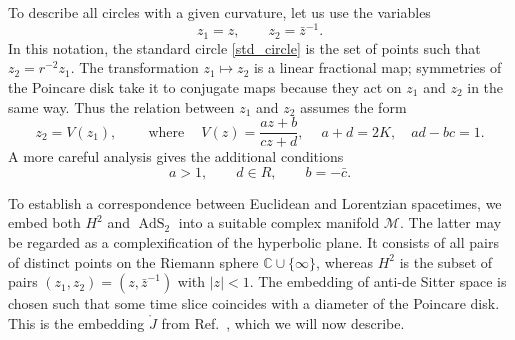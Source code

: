 \documentclass[11pt]{article}
\newcommand{\calM}{\mathcal{M}}
\newcommand{\RR}{\mathbb{R}}
\newcommand{\CC}{\mathbb{C}}
\DeclareMathOperator{\tAdS}{\widetilde{AdS}}
\DeclareMathOperator{\HH}{H}
\def\widetilde#1{#1}%
\def\HH{H}
\def\RR{R}
\begin{document}
To describe all circles with a given curvature, let us use the variables
\begin{equation}\label{z1z2}
z_1=z,\qquad z_2=\bar{z}^{-1}.
\end{equation}
In this notation, the standard circle \eqref{std_circle} is the set of points such that $z_2=r^{-2}z_1$. The transformation $z_1\mapsto z_2$ is a linear fractional map; symmetries of the Poincare disk take it to conjugate maps because they act on $z_1$ and $z_2$ in the same way. Thus the relation between $z_1$ and $z_2$ assumes the form
\begin{equation}\label{z2Vz1}
z_2=V(z_1),\qquad\: \text{where}\quad\:V(z)=\frac{az+b}{cz+d},\quad\:
a+d=2K,\quad ad-bc=1.
\end{equation}
A more careful analysis gives the additional conditions
\begin{equation}\label{abcd_cond1}
a>1,\qquad d\in\RR,\qquad b=-\bar{c}.
\end{equation}

To establish a correspondence between Euclidean and Lorentzian spacetimes, we embed both $\HH^2$ and $\tAdS_2$ into a suitable complex manifold $\calM$. The latter may be regarded as a complexification of the hyperbolic plane. It consists of all pairs of distinct points on the Riemann sphere $\CC\cup\{\infty\}$, whereas $\HH^2$ is the subset of pairs $(z_1,z_2)=(z,\bar{z}^{-1})$ with $|z|<1$. The embedding of anti-de Sitter space is chosen such that some time slice coincides with a diameter of the Poincare disk. This is the embedding $\mathring{J}$ from Ref.~\cite{SL2R}, which we will now describe.
\end{document}
